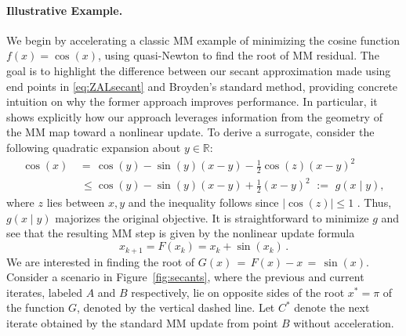 \documentclass{statsoc}
\begin{document}
\paragraph{Illustrative Example.}
We begin by accelerating a classic MM example of minimizing the cosine function  $f(x) = \cos(x)$, using quasi-Newton to find the root of MM residual. The goal is to highlight the difference between our secant approximation made using end points in \eqref{eq:ZALsecant} and Broyden's standard method, providing concrete intuition on why the former approach improves performance. In particular, it shows explicitly how our approach leverages  information from the geometry of the MM map toward a nonlinear update. 
To derive a surrogate, consider the following quadratic expansion about $y \in \mathbb{R}$:
\begin{align*} 
\cos(x) \,& =\, \cos(y)-  \sin(y)(x -y)- \frac{1}{2}\cos(z)(x-y)^2 \\ \,&\, \leq  \cos(y) - \sin(y)(x - y) + \frac{1}{2}(x-y)^2
 \,\, :=\,\, g(x \mid y), 
 \end{align*}
where $z$ lies between $x,y$ and the inequality follows since $|\cos(z)|\leq 1$
\citep{lange2016mm}. Thus, $g(x \mid y)$ majorizes the original objective. It is straightforward to minimize $g$ and see that the resulting MM step is given by the nonlinear update formula
\[
x_{k+1} = F(x_k) = x_k + \sin(x_k)\,.
\]
We are interested in finding the root of $G(x) \,=\, F(x) - x \,=\, \sin(x)$. Consider a scenario in Figure~\ref{fig:secants}, where the previous and current iterates, labeled $A$ and $B$ respectively, lie on opposite sides of the root $x^\ast = \pi$ of the function $G$, denoted by the vertical dashed line. Let $C^\ast$ denote the next iterate obtained by the standard MM update from point $B$ without acceleration. 
\end{document}
